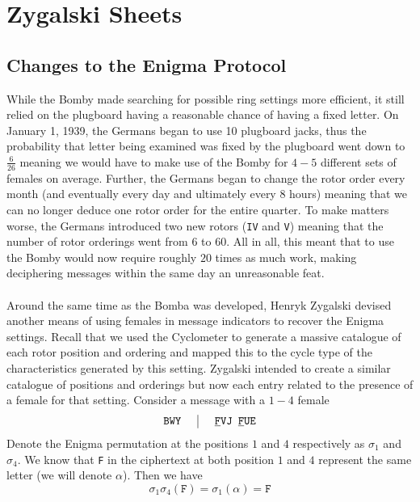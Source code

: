 \section{Zygalski Sheets}

\subsection{Changes to the Enigma Protocol}
While the Bomby made searching for possible ring settings more
efficient, it still relied on the plugboard having a reasonable
chance of having a fixed letter. On January 1, 1939, the Germans
began to use 10 plugboard jacks, thus the probability that letter
being examined was fixed by the plugboard went down to $\frac{6}{26}$
meaning we would have to make use of the Bomby for $4-5$ different
sets of females on average. Further, the Germans began to change the
rotor order every month (and eventually every day and ultimately
every 8 hours) meaning that we can no longer deduce one rotor order
for the entire quarter. To make matters worse, the Germans introduced
two new rotors (\texttt{IV} and \texttt{V}) meaning that the number
of rotor orderings went from $6$ to $60$. All in all, this meant that
to use the Bomby would now require roughly $20$ times as much work,
making deciphering messages within the same day an unreasonable feat.
\\\\Around the same time as the Bomba was developed, Henryk Zygalski
devised another means of using females in message indicators to
recover the Enigma settings. Recall that we used the Cyclometer to
generate a massive catalogue of each rotor position and ordering and
mapped this to the cycle type of the characteristics generated by
this setting. Zygalski intended to create a similar catalogue of
positions and orderings but now each entry related to the presence of
a female for that setting. Consider a message with a $1-4$ female
\[
	\setlength{\arraycolsep}{15pt}
	\begin{array}{c | c}
		\texttt{BWY} & {\uline{\texttt{F}}}\texttt{VJ
		}{\uline{\texttt{F}}}\texttt{UE}              \\
	\end{array}
\]
Denote the Enigma permutation at the positions $1$ and $4$
respectively as $\sigma_1$ and $\sigma_4$. We know that \texttt{F} in
the ciphertext at both position $1$ and $4$ represent the same letter
(we will denote $\alpha$). Then we have
\[
	\sigma_1\sigma_4(\texttt{F}) = \sigma_1(\alpha) = \texttt{F}
\]
